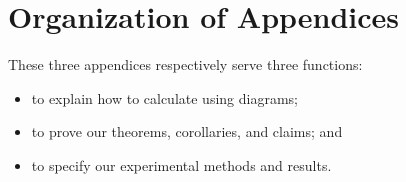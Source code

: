 \documentclass{article}
\theoremstyle{plain}
\theoremstyle{definition}
\begin{document}


    
    


\clearpage
\newpage
\renewcommand{\thesection}{\Alph{section}}
\setcounter{section}{0}

\section*{Organization of Appendices}
    These three appendices respectively serve three functions:
    \begin{itemize}
        \item to explain how to calculate using diagrams;
        \item to prove our theorems, corollaries, and claims; and
        \item to specify our experimental methods and results.
    \end{itemize}
\end{document}
